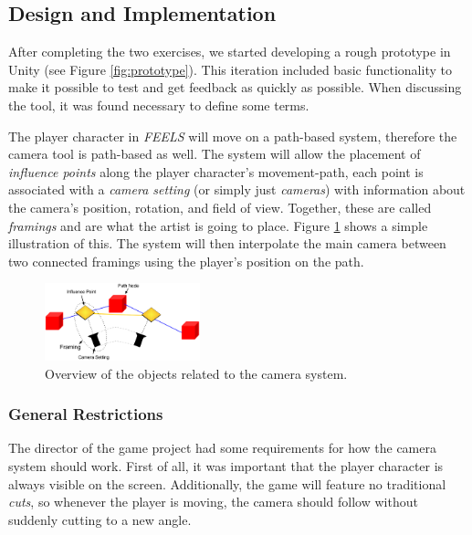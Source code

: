 \subsection{Design and Implementation}
After completing the two exercises, we started developing a rough prototype in Unity (see Figure \ref{fig:prototype}). This iteration included basic functionality to make it possible to test and get feedback as quickly as possible. When discussing the tool, it was found necessary to define some terms. 


The player character in \textit{FEELS} will move on a path-based system, therefore the camera tool is path-based as well. The system will allow the placement of \textit{influence points} along the player character's movement-path, each point is associated with a \textit{camera setting} (or simply just \textit{cameras}) with information about the camera's position, rotation, and field of view. Together, these are called \textit{framings} and are what the artist is going to place. Figure \ref{fig:manual_overview} shows a simple illustration of this. The system will then interpolate the main camera between two connected framings using the player's position on the path.

\begin{figure}[htbp]
\centering
\includegraphics[width=0.40\textwidth]{Pics/manual_overview}
\caption{Overview of the objects related to the camera system.}
\label{fig:manual_overview}
\end{figure}

\subsubsection{General Restrictions}
The director of the game project had some requirements for how the camera system should work. First of all, it was important that the player character is always visible on the screen. Additionally, the game will feature no traditional \textit{cuts}, so whenever the player is moving, the camera should follow without suddenly cutting to a new angle.

